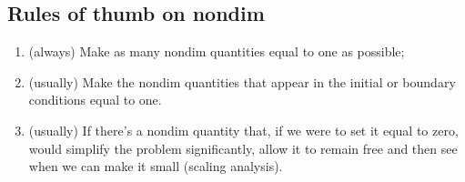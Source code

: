 \subsection{Rules of thumb on nondim}
\begin{enumerate}
\item (always) Make as many nondim quantities equal to one as possible;
\item (usually) Make the nondim quantities that appear in the initial or boundary conditions equal to one.
\item (usually) If there's a nondim quantity that, if we were to set it equal to zero, would simplify the problem significantly, allow it to remain free and then see when we can make it small (scaling analysis).
\end{enumerate}

